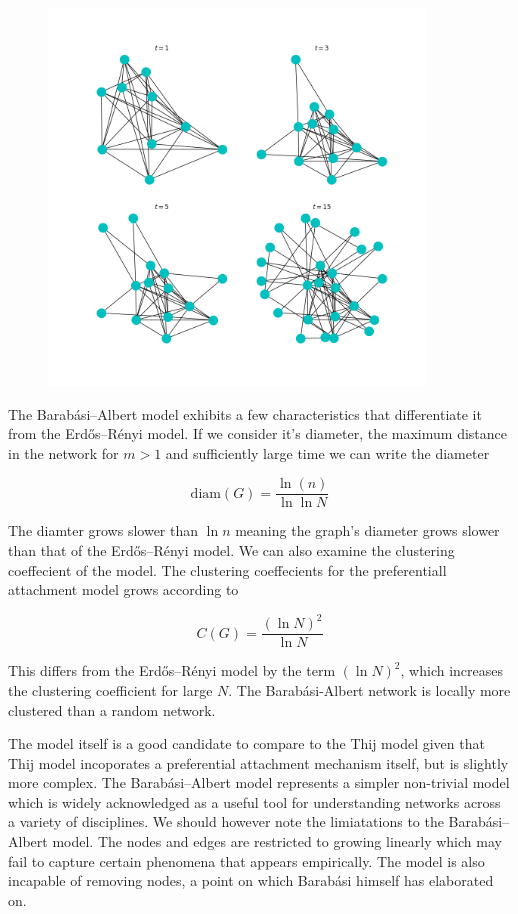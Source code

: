 \begin{figure}[h!]
    \includegraphics[width=10cm]{Images/early_graph_data210118-163357.png}
    \centering
\end{figure}

The Barabási–Albert model exhibits a few characteristics that differentiate it from the 
Erdős–Rényi model. If we consider it's diameter, the maximum distance in the network
for $m>1$ and sufficiently large time we can write the diameter 

$$\text{diam}(G) = \frac{\ln(n)}{\ln\ln N}$$

The diamter grows slower than $\ln n$ meaning the graph's diameter grows slower than that of the 
Erdős–Rényi model. We can also examine the clustering coeffecient of the model. 
The clustering coeffecients for the preferentiall attachment model grows according to

$$
C(G) = \frac{(\ln N)^2}{\ln N}
$$

This differs from the Erdős–Rényi model by the term $(\ln N)^2$,
which increases the clustering coefficient for large $N$.
The  Barabási-Albert  network  is  locally  more  clustered  than a random network.


The model itself is a good candidate to compare to the Thij model given that Thij model incoporates
a preferential attachment mechanism itself, but is slightly more complex. The Barabási–Albert model 
represents a simpler non-trivial model which is widely acknowledged as a useful tool
for understanding networks across a variety of disciplines. We should however note the 
limiatations to the Barabási–Albert model. The nodes and edges are restricted to growing linearly which
may fail to capture certain phenomena that appears empirically. The model is also incapable 
of removing nodes, a point on which Barabási himself has elaborated on.

